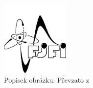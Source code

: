 		\begin{figure}[!hbt] %
		\centering
		\includegraphics[width=0.3\textwidth]{img/fjfi} %
		\caption{Popisek obrázku. Převzato z \cite{bib:zadani}} %
		\label{fig:testovaci} %
		\end{figure}			
			
